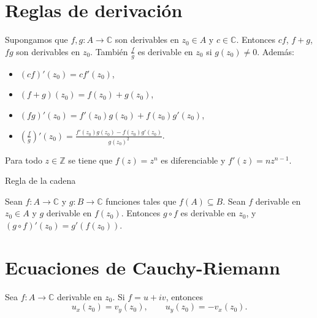 \documentclass[spanish,presentation]{beamer}
\begin{document}
\section{Reglas de derivación}
\label{sec-2}

\begin{frame}[label=sec-2-1]{}
\begin{theorem}
Supongamos que \(f,g\colon A\to \mathbb{C}\) son derivables en
\(z_{0}\in A\) y \(c\in \mathbb{C}\). Entonces \(cf\), \(f+g\),
\(fg\) son derivables en \(z_{0}\). También \(\frac{f}{g}\) es
derivable en \(z_{0}\) si \(g(z_{0})\ne 0\). Además:

\begin{itemize}
\item \((cf)'(z_{0})=cf'(z_{0})\),
\item \((f+g)(z_{0})=f(z_{0})+g(z_{0})\),
\item \((fg)'(z_{0})=f'(z_{0})g(z_{0})+f(z_{0})g'(z_{0})\),
\item \((\frac{f}{g})'(z_{0})=\frac{f'(z_{0})g(z_{0})-f(z_{0})g'(z_{0})}{g(z_{0})^{2}}\).
\end{itemize}
\end{theorem}

\begin{theorem}
Para todo \(z\in \mathbb{Z}\) se tiene que \(f(z)=z^{n}\) es
diferenciable y \(f'(z)=nz^{n-1}\).
\end{theorem}
\end{frame}

\begin{frame}[label=sec-2-2]{Regla de la cadena}
\begin{theorem}
Sean \(f\colon A\to \mathbb{C}\) y \(g\colon B\to \mathbb{C}\)
funciones tales que \(f(A)\subseteq B\). Sean \(f\) derivable en
\(z_{0}\in A\) y \(g\) derivable en \(f(z_{0})\). Entonces
\(g\circ f\) es derivable en \(z_{0}\), y \((g\circ
    f)'(z_{0})=g'(f(z_{0}))\). 
\end{theorem}
\end{frame}

\section{Ecuaciones de Cauchy-Riemann}
\label{sec-3}

\begin{frame}[label=sec-3-1]{}
\begin{theorem}
Sea \(f\colon A\to \mathbb{C}\) derivable en \(z_{0}\). Si
\(f=u+iv\), entonces
\begin{displaymath}
u_{x}(z_{0})=v_{y}(z_{0}),\qquad u_{y}(z_{0})=-v_{x}(z_{0}).
\end{displaymath}
\end{theorem}
\end{frame}
\end{document}
